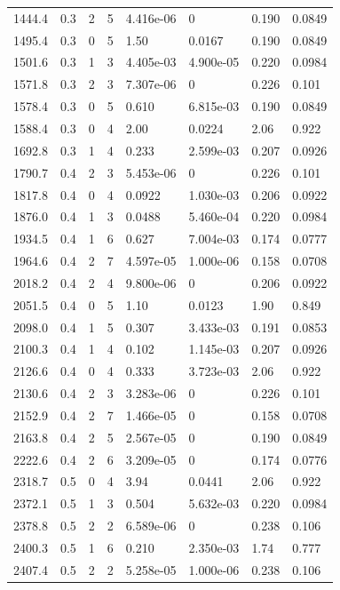 \documentclass[preview]{standalone}
\begin{document}
{{{\begin{tabular}{L{1.2cm}C{1.2cm} C{0.3cm}C{0.5cm} C{1.4cm}C{1.4cm} C{1.4cm}C{1.4cm}}
  1444.4  &   0.3  & 2     &  5 &  4.416e-06  & 0  & 0.190 &  0.0849   \\ 
  1495.4  &   0.3  & 0     &  5 &  1.50  & 0.0167  & 0.190 &  0.0849   \\ 
  1501.6  &   0.3  & 1     &  3 &  4.405e-03  & 4.900e-05  & 0.220 &  0.0984   \\ 
  1571.8  &   0.3  & 2     &  3 &  7.307e-06  & 0  & 0.226 &  0.101   \\ 
  1578.4  &   0.3  & 0     &  5 &  0.610  & 6.815e-03  & 0.190 &  0.0849   \\ 
  1588.4  &   0.3  & 0     &  4 &  2.00  & 0.0224  & 2.06 &  0.922   \\ 
  1692.8  &   0.3  & 1     &  4 &  0.233  & 2.599e-03  & 0.207 &  0.0926   \\ 
  1790.7  &   0.4  & 2     &  3 &  5.453e-06  & 0  & 0.226 &  0.101   \\ 
  1817.8  &   0.4  & 0     &  4 &  0.0922  & 1.030e-03  & 0.206 &  0.0922   \\ 
  1876.0  &   0.4  & 1     &  3 &  0.0488  & 5.460e-04  & 0.220 &  0.0984   \\ 
  1934.5  &   0.4  & 1     &  6 &  0.627  & 7.004e-03  & 0.174 &  0.0777   \\ 
  1964.6  &   0.4  & 2     &  7 &  4.597e-05  & 1.000e-06  & 0.158 &  0.0708   \\ 
  2018.2  &   0.4  & 2     &  4 &  9.800e-06  & 0  & 0.206 &  0.0922   \\ 
  2051.5  &   0.4  & 0     &  5 &  1.10  & 0.0123  & 1.90 &  0.849   \\ 
  2098.0  &   0.4  & 1     &  5 &  0.307  & 3.433e-03  & 0.191 &  0.0853   \\ 
  2100.3  &   0.4  & 1     &  4 &  0.102  & 1.145e-03  & 0.207 &  0.0926   \\ 
  2126.6  &   0.4  & 0     &  4 &  0.333  & 3.723e-03  & 2.06 &  0.922   \\ 
  2130.6  &   0.4  & 2     &  3 &  3.283e-06  & 0  & 0.226 &  0.101   \\ 
  2152.9  &   0.4  & 2     &  7 &  1.466e-05  & 0  & 0.158 &  0.0708   \\ 
  2163.8  &   0.4  & 2     &  5 &  2.567e-05  & 0  & 0.190 &  0.0849   \\ 
  2222.6  &   0.4  & 2     &  6 &  3.209e-05  & 0  & 0.174 &  0.0776   \\ 
  2318.7  &   0.5  & 0     &  4 &  3.94  & 0.0441  & 2.06 &  0.922   \\ 
  2372.1  &   0.5  & 1     &  3 &  0.504  & 5.632e-03  & 0.220 &  0.0984   \\ 
  2378.8  &   0.5  & 2     &  2 &  6.589e-06  & 0  & 0.238 &  0.106   \\ 
  2400.3  &   0.5  & 1     &  6 &  0.210  & 2.350e-03  & 1.74 &  0.777   \\ 
  2407.4  &   0.5  & 2     &  2 &  5.258e-05  & 1.000e-06  & 0.238 &  0.106   \\ 
\hline 
\end{tabular} 

}}}
\end{document}
